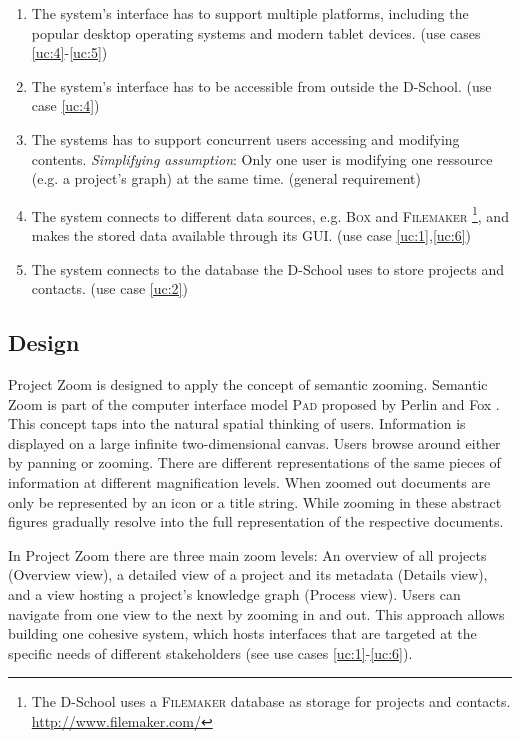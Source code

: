 \begin{enumerate}
\item The system's interface has to support multiple platforms, including the popular desktop operating systems and modern tablet devices. (use cases \ref{uc:4}-\ref{uc:5}) \label{req:1}
\item The system's interface has to be accessible from outside the D-School. (use case \ref{uc:4}) \label{req:2}
\item The systems has to support concurrent users accessing and modifying contents. \textit{Simplifying assumption}: Only one user is modifying one ressource (e.g. a project's graph) at the same time. (general requirement) \label{req:3}
\item The system connects to different data sources, e.g. \textsc{Box} and \textsc{Filemaker} \footnote{The D-School uses a \textsc{Filemaker} database as storage for projects and contacts. \url{http://www.filemaker.com/}}, and makes the stored data available through its GUI. (use case \ref{uc:1},\ref{uc:6}) \label{req:4}
\item The system connects to the database the D-School uses to store projects and contacts. (use case \ref{uc:2}) \label{req:4}

\end{enumerate}

\subsection{Design}
\label{sec:design}

Project Zoom is designed to apply the concept of semantic zooming. Semantic Zoom is part of the computer interface model \textsc{Pad} proposed by Perlin and Fox \cite{Perlin_1993}. This concept taps into the natural spatial thinking of users. Information is displayed on a large infinite two-dimensional canvas. Users browse around either by panning or zooming. There are different representations of the same pieces of information at different magnification levels. When zoomed out documents are only be represented by an icon or a title string. While zooming in these abstract figures gradually resolve into the full representation of the respective documents. 

In Project Zoom there are three main zoom levels: An overview of all projects (Overview view), a detailed view of a project and its metadata (Details view), and a view hosting a project's knowledge graph (Process view). Users can navigate from one view to the next by zooming in and out. This approach allows building one cohesive system, which hosts interfaces that are targeted at the specific needs of different stakeholders (see use cases \ref{uc:1}-\ref{uc:6}). 

